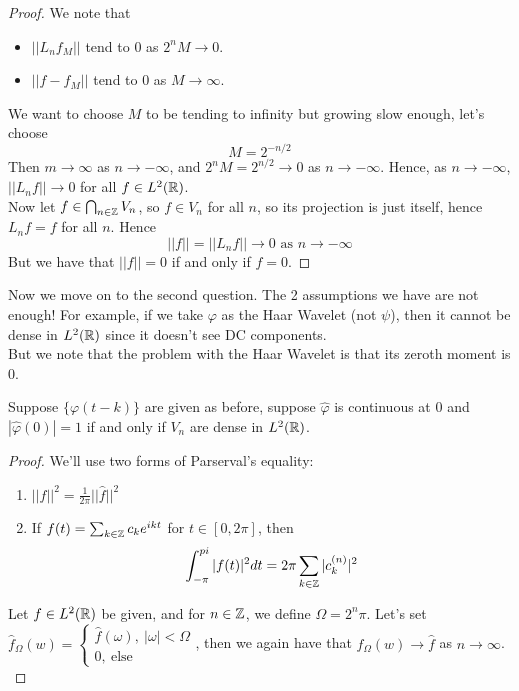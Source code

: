 \documentclass{article}
\begin{document}
{\begin{proof}
    We note that
    \begin{itemize}
        \item $ ||L_n f_M|| $ tend to $0$ as $2^n M \to 0$.
        \item $|| f - f_M||$ tend to $0$ as $M \to \infty$.
    \end{itemize}
    We want to choose $M$ to be tending to infinity but growing slow enough, let's choose
    \[M = 2^{-n/2}\]
    Then $m \to \infty$ as $n \to -\infty$, and $2^n M = 2^{n/2} \to 0$ as $n \to -\infty$. Hence, as $n \to -\infty$, $||L_n f|| \to 0$ for all $f \in L^2(\mathbb{R})$.\\

    Now let $f \in \bigcap_{n \in \mathbb{Z}} V_n$, so $f \in V_n$ for all $n$, so its projection is just itself, hence $L_n f = f$ for all $n$. Hence
    \[||f|| = ||L_n f|| \to 0 \text{ as } n \to -\infty\]
    But we have that $||f|| = 0$ if and only if $f = 0$. 
\end{proof}

Now we move on to the second question. The 2 assumptions we have are not enough! For example, if we take $\varphi$ as the Haar Wavelet (not $\psi$), then it cannot be dense in $L^2(\mathbb{R})$ since it doesn't see DC components.\\

But we note that the problem with the Haar Wavelet is that its zeroth moment is $0$.

\begin{theorem}
    Suppose $\{\varphi(t - k)\}$ are given as before, suppose $\widehat{\varphi}$ is continuous at $0$ and $|\widehat{\varphi}(0)| = 1$ if and only if $V_n$ are dense in $L^2(\mathbb{R})$.
\end{theorem}

\begin{proof}
    We'll use two forms of Parserval's equality:
    \begin{enumerate}
        \item $||f||^2 = \frac{1}{2\pi} ||\widehat{f}||^2$
        \item If $f(t) = \sum_{k \in \mathbb{Z}} c_k e^{ikt}$ for $t \in [0, 2\pi]$, then
        \[\int_{-\pi}^{pi} |f(t)|^2 dt = 2\pi \sum_{k \in \mathbb{Z}} |c_k^{(n)}|^2 \]
    \end{enumerate}
    Let $f \in L^2(\mathbb{R})$ be given, and for $n \in \mathbb{Z}$, we define $\Omega = 2^n \pi$. Let's set $\widehat{f}_\Omega(w) = \begin{cases}
        \widehat{f}(\omega),\ |\omega| < \Omega\\
        0,\ \text{else}
    \end{cases}$, then we again have that $\widehat{f}_\Omega(w) \to \widehat{f}$ as $n \to \infty$.\\


\end{proof}}
\end{document}
